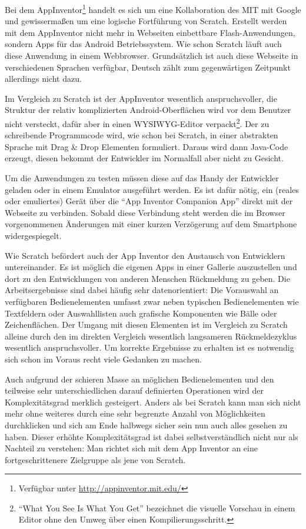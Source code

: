 Bei dem AppInventor\footnote{Verfügbar unter \url{http://appinventor.mit.edu/}} handelt es sich um eine Kollaboration des MIT mit Google und gewissermaßen um eine logische Fortführung von Scratch. Erstellt werden mit dem AppInventor nicht mehr in Webseiten einbettbare Flash-Anwendungen, sondern Apps für das Android Betriebssystem. Wie schon Scratch läuft auch diese Anwendung in einem Webbrowser. Grundsätzlich ist auch diese Webseite in verschiedenen Sprachen verfügbar, Deutsch zählt zum gegenwärtigen Zeitpunkt allerdings nicht dazu.

Im Vergleich zu Scratch ist der AppInventor wesentlich anspruchsvoller, die Struktur der relativ komplizierten Android-Oberflächen wird vor dem Benutzer nicht versteckt, dafür aber in einen WYSIWYG-Editor verpackt\footnote{"`What You See Is What You Get"' bezeichnet die visuelle Vorschau in einem Editor ohne den Umweg über einen Kompilierungsschritt.}. Der zu schreibende Programmcode wird, wie schon bei Scratch, in einer abstrakten Sprache mit Drag \& Drop Elementen formuliert. Daraus wird dann Java-Code erzeugt, diesen bekommt der Entwickler im Normalfall aber nicht zu Gesicht.

Um die Anwendungen zu testen müssen diese auf das Handy der Entwickler geladen oder in einem Emulator ausgeführt werden. Es ist dafür nötig, ein (reales oder emuliertes) Gerät über die "`App Inventor Companion App"' direkt mit der Webseite zu verbinden. Sobald diese Verbindung steht werden die im Browser vorgenommenen Änderungen mit einer kurzen Verzögerung auf dem Smartphone widergespiegelt.

Wie Scratch befördert auch der App Inventor den Austausch von Entwicklern untereinander. Es ist möglich die eigenen Apps in einer Gallerie auszustellen und dort zu den Entwicklungen von anderen Menschen Rückmeldung zu geben. Die Arbeitsergebnisse sind dabei häufig sehr datenorientiert: Die Vorauswahl an verfügbaren Bedienelementen umfasst zwar neben typischen Bedienelementen wie Textfeldern oder Auswahllisten auch grafische Komponenten wie Bälle oder Zeichenflächen. Der Umgang mit diesen Elementen ist im Vergleich zu Scratch alleine durch den im direkten Vergleich wesentlich langsameren Rückmeldezyklus wesentlich anspruchsvoller. Um korrekte Ergebnisse zu erhalten ist es notwendig sich schon im Voraus recht viele Gedanken zu machen.

Auch aufgrund der schieren Masse an möglichen Bedienelementen und den teilweise sehr unterschiedlichen darauf definierten Operationen wird der Komplexitätsgrad merklich gesteigert. Anders als bei Scratch kann man sich nicht mehr ohne weiteres durch eine sehr begrenzte Anzahl von Möglichkeiten durchklicken und sich am Ende halbwegs sicher sein nun auch alles gesehen zu haben. Dieser erhöhte Komplexitätsgrad ist dabei selbstverständlich nicht nur als Nachteil zu verstehen: Man richtet sich mit dem App Inventor an eine fortgeschrittenere Zielgruppe als jene von Scratch.

